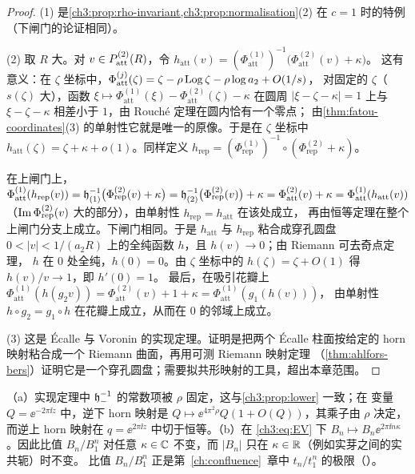 \begin{proof}
(1) 是\cref{ch3:prop:rho-invariant,ch3:prop:normalisation}(2) 在 $c=1$ 时的特例
（下闸门的论证相同）。

(2) 取 $R$ 大。对 $v\in P_{\mathrm{att}}^{(2)}(R)$，令
$h_{\mathrm{att}}(v)=(\Phi^{(1)}_{\mathrm{att}})^{-1}\bigl(\Phi^{(2)}_{\mathrm{att}}(v)+\kappa\bigr)$。
这有意义：在 $\zeta$ 坐标中，$\Phi^{(j)}_{\mathrm{att}}(\zeta)=\zeta-\rho\operatorname{Log}\zeta-\rho\log a_2+O(1/s)$，
对固定的 $\zeta$（$s(\zeta)$ 大），函数 $\xi\mapsto\Phi^{(1)}_{\mathrm{att}}(\xi)-\Phi^{(2)}_{\mathrm{att}}(\zeta)-\kappa$
在圆周 $|\xi-\zeta-\kappa|=1$ 上与 $\xi-\zeta-\kappa$ 相差小于 $1$，由 Rouché 定理在圆内恰有一个零点；
由\cref{thm:fatou-coordinates}(3) 的单射性它就是唯一的原像。于是在 $\zeta$ 坐标中
$h_{\mathrm{att}}(\zeta)=\zeta+\kappa+o(1)$。同样定义
$h_{\mathrm{rep}}=(\Phi^{(1)}_{\mathrm{rep}})^{-1}\circ(\Phi^{(2)}_{\mathrm{rep}}+\kappa)$。

在上闸门上，$\Phi^{(1)}_{\mathrm{att}}(h_{\mathrm{rep}}(v))
=\mathfrak h_{(1)}^{-1}\bigl(\Phi^{(2)}_{\mathrm{rep}}(v)+\kappa\bigr)
=\mathfrak h_{(2)}^{-1}\bigl(\Phi^{(2)}_{\mathrm{rep}}(v)\bigr)+\kappa
=\Phi^{(2)}_{\mathrm{att}}(v)+\kappa
=\Phi^{(1)}_{\mathrm{att}}(h_{\mathrm{att}}(v))$
（$\operatorname{Im}\Phi^{(2)}_{\mathrm{rep}}(v)$ 大的部分），由单射性 $h_{\mathrm{rep}}=h_{\mathrm{att}}$ 在该处成立，
再由恒等定理在整个上闸门分支上成立。下闸门相同。于是 $h_{\mathrm{att}}$ 与 $h_{\mathrm{rep}}$
粘合成穿孔圆盘 $0<|v|<1/(a_2R)$ 上的全纯函数 $h$，且 $h(v)\to0$；由 Riemann 可去奇点定理，
$h$ 在 $0$ 处全纯，$h(0)=0$。由 $\zeta$ 坐标中的 $h(\zeta)=\zeta+O(1)$ 得 $h(v)/v\to1$，即 $h'(0)=1$。
最后，在吸引花瓣上
$\Phi^{(1)}_{\mathrm{att}}(h(g_2v))=\Phi^{(2)}_{\mathrm{att}}(v)+1+\kappa=\Phi^{(1)}_{\mathrm{att}}(g_1(h(v)))$，
由单射性 $h\circ g_2=g_1\circ h$ 在花瓣上成立，从而在 $0$ 的邻域上成立。

(3) 这是 Écalle \cite{Ecalle1981} 与 Voronin \cite{Voronin1981} 的实现定理。证明是把两个
Écalle 柱面按给定的 horn 映射粘合成一个 Riemann 曲面，再用可测 Riemann 映射定理
（\cref{thm:ahlfors-bers}）证明它是一个穿孔圆盘；需要拟共形映射的工具，超出本章范围。
\end{proof}

\begin{remark}
（a）实现定理中 $\mathfrak h_-^{-1}$ 的常数项被 $\rho$ 固定，这与\cref{ch3:prop:lower} 一致；在
变量 $Q=\ee^{-2\pi\ii z}$ 中，逆下 horn 映射是 $Q\mapsto\ee^{4\pi^2\rho}Q(1+O(Q))$，其乘子由 $\rho$
决定，而逆上 horn 映射在 $q=\ee^{2\pi\ii z}$ 中切于恒等。（b）在 \eqref{ch3:eq:EV} 下 $B_n\mapsto B_n\ee^{2\pi\ii n\kappa}$。因此比值 $B_n/B_1^n$
对任意 $\kappa\in\mathbb{C}$ 不变，而 $|B_n|$ 只在 $\kappa\in\mathbb{R}$（例如实芽之间的实共轭）时不变。
比值 $B_n/B_1^n$ 正是第~\ref{ch:confluence}~章中 $t_n/t_1^n$ 的极限（\cite[Cor.~4.5]{KneserPaper}）。
\end{remark}

